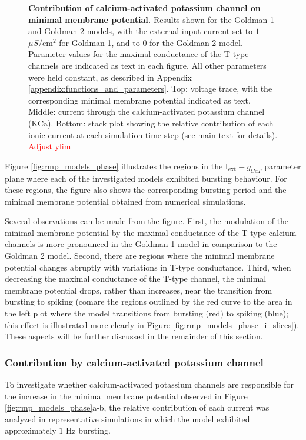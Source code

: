 \documentclass[../main.tex]{subfiles}
\begin{document}
{\begin{figure}[!t]
    \caption[Contribution of calcium-activated potassium channel on minimal membrane potential]{\textbf{Contribution of calcium-activated potassium channel on minimal membrane potential.} Results shown for the Goldman 1 and Goldman 2 models, with the external input current set to $1$ $\mu S/\text{cm}^2$ for Goldman 1, and to $0$ for the Goldman 2 model. Parameter values for the maximal conductance of the T-type channels are indicated as text in each figure. All other parameters were held constant, as described in Appendix \ref{appendix:functions_and_parameters}. Top: voltage trace, with the corresponding minimal membrane potential indicated as text. Middle: current through the calcium-activated potassium channel (KCa). Bottom: stack plot showing the relative contribution of each ionic current at each simulation time step (see main text for details). \textcolor{red}{Adjust ylim}}
    \label{fig:rmp_models_contrib_fig_goldman}
\end{figure}
}



Figure \ref{fig:rmp_models_phase} illustrates the regions in the I$_{\text{ext}}-g_{CaT}$ parameter plane where each of the investigated models exhibited bursting behaviour. For these regions, the figure also shows the corresponding bursting period and the minimal membrane potential obtained from numerical simulations.

Several observations can be made from the figure. First, the modulation of the minimal membrane potential by the maximal conductance of the T-type calcium channels is more pronounced in the Goldman 1 model in comparison to the Goldman 2 model. Second, there are regions where the minimal membrane potential changes abruptly with variations in T-type conductance. Third, when decreasing the maximal conductance of the T-type channel, the minimal membrane potential drops, rather than increases, near the transition from bursting to spiking (comare the regions outlined by the red curve to the area in the left plot where the model transitions from bursting (red) to spiking (blue); this effect is illustrated more clearly in Figure \ref{fig:rmp_models_phase_i_slices}). These aspects will be further discussed in the remainder of this section.


\subsubsection{Contribution by calcium-activated potassium channel}

\noindent To investigate whether calcium-activated potassium channels are responsible for the increase in the minimal membrane potential observed in Figure \ref{fig:rmp_models_phase}a-b, the relative contribution of each current was analyzed in representative simulations in which the model exhibited approximately $1$ Hz bursting.
\end{document}
